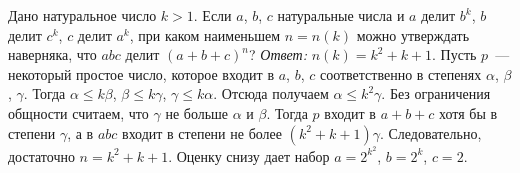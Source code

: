 \problem
Дано натуральное число $k > 1$.
Если $a$, $b$, $c$ натуральные числа и
$a$ делит $b^k$, $b$ делит $c^k$, $c$ делит $a^k$,
при каком наименьшем $n = n(k)$ можно утверждать наверняка, что
$a b c$ делит $(a + b + c)^n$?
\solution
\emph{Ответ:} $n(k) = k^2 + k + 1$.
Пусть $p$~--- некоторый простое число, которое входит в $a$, $b$, $c$
соответственно в степенях $\alpha$, $\beta$, $\gamma$.
Тогда
$\alpha \leq k \beta$, $\beta \leq k \gamma$, $\gamma \leq k \alpha$.
Отсюда получаем $\alpha \leq k^2 \gamma$.
Без ограничения общности считаем, что $\gamma$ не больше $\alpha$ и $\beta$.
Тогда $p$ входит в $a + b + c$ хотя бы в степени $\gamma$, а в $a b c$ входит в
степени не более $(k^2 + k + 1) \gamma$.
Следовательно, достаточно $n = k^2 + k + 1$.
Оценку снизу дает набор $a = 2^{k^2}$, $b = 2^k$, $c = 2$.
\endproblem
